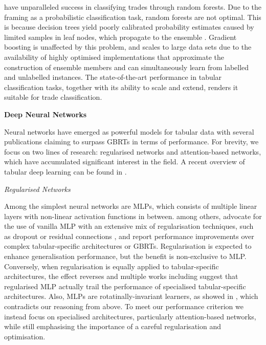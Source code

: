 \textcite[][13--14]{ronenMachineLearningTrade2022} have unparalleled success in classifying trades through random forests. Due to the framing as a probabilistic classification task, random forests are not optimal. This is because decision trees yield poorly calibrated probability estimates caused by limited samples in leaf nodes, which propagate to the ensemble \autocite[][356--360]{tanhaSemisupervisedSelftrainingDecision2017}. Gradient boosting is unaffected by this problem, and scales to large data sets due to the availability of highly optimised implementations that approximate the construction of ensemble members and can simultaneously learn from labelled and unlabelled instances. The state-of-the-art performance in tabular classification tasks, together with its ability to scale and extend, renders it suitable for trade classification.


\textbf{Deep Neural Networks}

Neural networks have emerged as powerful models for tabular data with several publications claiming to surpass \glspl{GBRT} in terms of performance. For brevity, we focus on two lines of research: regularised networks and attention-based networks, which have accumulated significant interest in the field. A recent overview of tabular deep learning can be found in \textcite[][1--22]{borisovDeepNeuralNetworks2022}.

\emph{Regularised Networks}

Among the simplest neural networks are \glspl{MLP}, which consists of multiple linear layers with non-linear activation functions in between. \textcite[][9--10]{kadraWelltunedSimpleNets2021} among others, advocate for the use of vanilla \gls{MLP} with an extensive mix of regularisation techniques, such as dropout \autocite{srivastavaDropoutSimpleWay} or residual connections \autocite{heDeepResidualLearning2015}, and report performance improvements over complex tabular-specific architectures or \glspl{GBRT}. Regularisation is expected to enhance generalisation performance, but the benefit is non-exclusive to \gls{MLP}. Conversely, when regularisation is equally applied to tabular-specific architectures, the effect reverses and multiple works including \textcites[][7]{gorishniyRevisitingDeepLearning2021}[][5]{grinsztajnWhyTreebasedModels2022} suggest that regularised \gls{MLP} actually trail the performance of specialised tabular-specific architectures. Also, \glspl{MLP} are rotatinally-invariant learners, as showed in \textcite[][5]{grinsztajnWhyTreebasedModels2022}, which contradicts our reasoning from above. To meet our performance criterion we instead focus on specialised architectures, particularly attention-based networks, while still emphasising the importance of a careful regularisation and optimisation.

